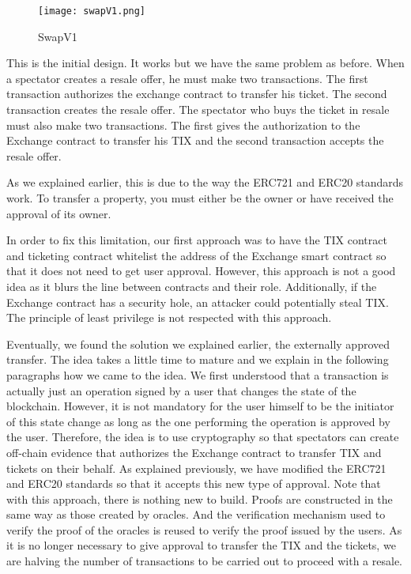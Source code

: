 \documentclass[a4paper,11pt,oneside]{report}
\begin{document}
\begin{figure}[h!]
  \texttt{[image: swapV1.png]}
  \caption{SwapV1}
  \label{fig:swapV1}
\end{figure}

This is the initial design. It works but we have the same problem as before. When a spectator creates a resale offer, he must make two transactions. The first transaction authorizes the exchange contract to transfer his ticket. The second transaction creates the resale offer. The spectator who buys the ticket in resale must also make two transactions. The first gives the authorization to the Exchange contract to transfer his TIX and the second transaction accepts the resale offer.

As we explained earlier, this is due to the way the ERC721 and ERC20 standards work. To transfer a property, you must either be the owner or have received the approval of its owner.

In order to fix this limitation, our first approach was to have the TIX contract and ticketing contract whitelist the address of the Exchange smart contract so that it does not need to get user approval. However, this approach is not a good idea as it blurs the line between contracts and their role. Additionally, if the Exchange contract has a security hole, an attacker could potentially steal TIX. The principle of least privilege is not respected with this approach.

Eventually, we found the solution we explained earlier, the externally approved transfer. The idea takes a little time to mature and we explain in the following paragraphs how we came to the idea. We first understood that a transaction is actually just an operation signed by a user that changes the state of the blockchain. However, it is not mandatory for the user himself to be the initiator of this state change as long as the one performing the operation is approved by the user. Therefore, the idea is to use cryptography so that spectators can create off-chain evidence that authorizes the Exchange contract to transfer TIX and tickets on their behalf. As explained previously, we have modified the ERC721 and ERC20 standards so that it accepts this new type of approval. Note that with this approach, there is nothing new to build. Proofs are constructed in the same way as those created by oracles. And the verification mechanism used to verify the proof of the oracles is reused to verify the proof issued by the users. As it is no longer necessary to give approval to transfer the TIX and the tickets, we are halving the number of transactions to be carried out to proceed with a resale.
\end{document}

